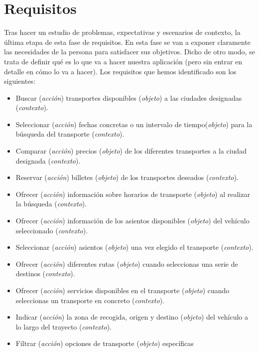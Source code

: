 \section{Requisitos}
Tras hacer un estudio de problemas, expectativas y escenarios de contexto, la
última etapa de esta fase de requisitos. En esta fase se van a exponer
claramente las necesidades de la persona para satisfacer sus objetivos. Dicho
de otro modo, se trata de definir qué es lo que va a hacer nuestra aplicación
(pero sin entrar en detalle en cómo lo va a hacer). Los requisitos que hemos
identificado son los siguientes:
\begin{itemize}
      \item Buscar (\textit{acción}) transportes disponibles (\textit{objeto}) a las
            ciudades designadas (\textit{contexto}).
      \item Seleccionar (\textit{acción}) fechas concretas o un intervalo de
            tiempo(\textit{objeto}) para la búsqueda del transporte (\textit{contexto}).
      \item Comparar (\textit{acción}) precios (\textit{objeto}) de los diferentes
            transportes a la ciudad designada (\textit{contexto}).
      \item Reservar (\textit{acción}) billetes (\textit{objeto}) de los transportes
            deseados (\textit{contexto}).
      \item Ofrecer (\textit{acción}) información sobre horarios de transporte
            (\textit{objeto}) al realizar la búsqueda (\textit{contexto}).
      \item Ofrecer (\textit{acción}) información de los asientos disponibles
            (\textit{objeto}) del vehículo seleccionado (\textit{contexto}).
      \item Seleccionar (\textit{acción}) asientos (\textit{objeto}) una vez elegido el
            transporte (\textit{contexto}).
      \item Ofrecer (\textit{acción}) diferentes rutas (\textit{objeto}) cuando seleccionas
            una serie de destinos (\textit{contexto}).
      \item Ofrecer (\textit{acción}) servicios disponibles en el transporte
            (\textit{objeto}) cuando seleccionas un transporte en concreto
            (\textit{contexto}).
      \item Indicar (\textit{acción}) la zona de recogida, origen y destino
            (\textit{objeto}) del vehículo a lo largo del trayecto (\textit{contexto}).
      \item Filtrar (\textit{acción}) opciones de transporte (\textit{objeto}) específicas

\end{itemize}
